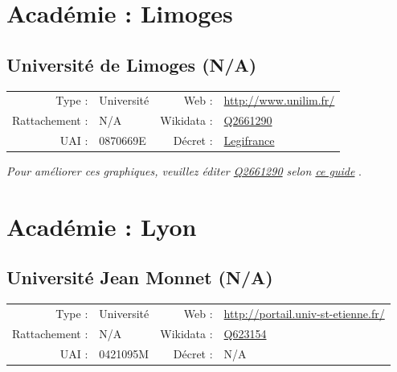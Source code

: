 \documentclass[11pt,french,landscape]{article}
\begin{document}

\newpage

\hypertarget{acaduxe9mie-limoges}{%
\section{Académie : Limoges}\label{acaduxe9mie-limoges}}

\hypertarget{universituxe9-de-limoges-na}{%
\subsection{Université de Limoges
(N/A)}\label{universituxe9-de-limoges-na}}

\begin{tabular*}{0.45\textwidth}{rp{2cm}rl}  
\hline  
Type : & Université & Web : &\href{http://www.unilim.fr/}{http://www.unilim.fr/} \\  
Rattachement : & N/A & Wikidata : & \href{https://www.wikidata.org/entity/Q2661290}{Q2661290} \\  
UAI : & 0870669E & Décret : & \href{https://www.legifrance.gouv.fr/eli/decret/2016/12/15/MENS1630827D/jo/texte/fr}{Legifrance} \\  
\hline  
\end{tabular*}

\textit{\scriptsize Pour améliorer ces graphiques, veuillez éditer \href{https://www.wikidata.org/entity/Q2661290}{Q2661290}  selon \href{https://github.com/cpesr/wikidataESR/blob/master/Rmd/wikidataESR.md}{ce guide}}
.


\newpage

\hypertarget{acaduxe9mie-lyon}{%
\section{Académie : Lyon}\label{acaduxe9mie-lyon}}

\hypertarget{universituxe9-jean-monnet-na}{%
\subsection{Université Jean Monnet
(N/A)}\label{universituxe9-jean-monnet-na}}

\begin{tabular*}{0.45\textwidth}{rp{2cm}rl}  
\hline  
Type : & Université & Web : &\href{http://portail.univ-st-etienne.fr/}{http://portail.univ-st-etienne.fr/} \\  
Rattachement : & N/A & Wikidata : & \href{https://www.wikidata.org/entity/Q623154}{Q623154} \\  
UAI : & 0421095M & Décret : & N/A \\  
\hline  
\end{tabular*}
\end{document}
